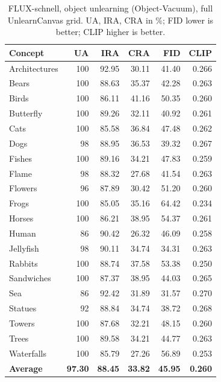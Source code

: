 \documentclass{article}
\begin{document}
\begin{table}[t]
\caption{FLUX-schnell, object unlearning (Object-Vacuum), full
UnlearnCanvas grid. UA, IRA, CRA in $\%$; FID lower is better; CLIP
higher is better.}
\label{tab:obj}
\centering
\small
\begin{tabular}{lrrrrr}
\toprule
Concept & UA & IRA & CRA & FID & CLIP \\
\midrule
Architectures & 100  & 92.95 & 30.11 & 41.40 & 0.266 \\
Bears         & 100  & 88.63 & 35.37 & 42.28 & 0.263 \\
Birds         & 100  & 86.11 & 41.16 & 50.35 & 0.260 \\
Butterfly     & 100  & 89.26 & 32.11 & 40.92 & 0.261 \\
Cats          & 100  & 85.58 & 36.84 & 47.48 & 0.262 \\
Dogs          & 98   & 88.95 & 36.53 & 39.32 & 0.267 \\
Fishes        & 100  & 89.16 & 34.21 & 47.83 & 0.259 \\
Flame         & 98   & 88.32 & 27.68 & 41.54 & 0.263 \\
Flowers       & 96   & 87.89 & 30.42 & 51.20 & 0.260 \\
Frogs         & 100  & 85.05 & 35.16 & 64.42 & 0.234 \\
Horses        & 100  & 86.21 & 38.95 & 54.37 & 0.261 \\
Human         & 86   & 90.42 & 26.32 & 46.09 & 0.258 \\
Jellyfish     & 98   & 90.11 & 34.74 & 34.31 & 0.263 \\
Rabbits       & 100  & 88.74 & 37.58 & 53.38 & 0.250 \\
Sandwiches    & 100  & 87.37 & 38.95 & 44.03 & 0.265 \\
Sea           & 86   & 92.42 & 31.89 & 31.57 & 0.270 \\
Statues       & 92   & 88.84 & 34.74 & 38.72 & 0.268 \\
Towers        & 100  & 87.68 & 32.21 & 48.15 & 0.260 \\
Trees         & 100  & 89.58 & 34.21 & 44.77 & 0.263 \\
Waterfalls    & 100  & 85.79 & 27.26 & 56.89 & 0.253 \\
\midrule
\textbf{Average} & \textbf{97.30} & \textbf{88.45} & \textbf{33.82} & \textbf{45.95} & \textbf{0.260} \\
\bottomrule
\end{tabular}
\end{table}
\end{document}
